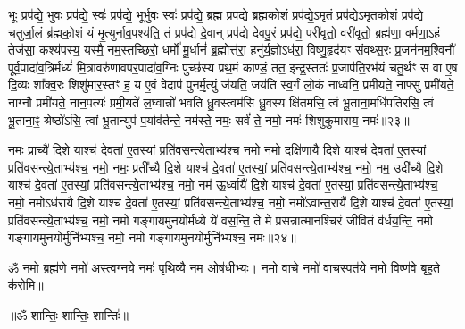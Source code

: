 भूः प्रप॑द्ये॒ भुवः॒ प्रप॑द्ये॒ स्वः॑ प्रप॑द्ये॒ भूर्भुवः॒ स्वः॑ प्रप॑द्ये॒ ब्रह्म॒ प्रप॑द्ये ब्रह्मको॒शं प्रप॑द्ये॒ऽमृतं॒ प्रप॑द्येऽमृतको॒शं प्रप॑द्ये चतुर्जा॒लं ब्र॑ह्मको॒शं यं मृ॒त्युर्नाव॒पश्य॑ति॒ तं प्रप॑द्ये दे॒वान् प्रप॑द्ये देवपु॒रं प्रप॑द्ये॒ परी॑वृतो॒ वरी॑वृतो॒ ब्रह्म॑णा॒ वर्म॑णा॒ऽहं तेज॑सा॒ कश्य॑पस्य॒ यस्मै॒ नम॒स्तच्छिरो॒ धर्मो॑ मू॒र्धानं॑ ब्र॒ह्मोत्त॑रा॒ हनु॑र्य॒ज्ञोऽध॑रा॒ विष्णु॒\ar{}हृद॑यꣳ संवथ्स॒रः प्र॒जन॑नम॒श्विनौ॑ पूर्व॒पादा॑व॒त्रिर्मध्यं॑ मि॒त्रावरु॑णावपर॒पादा॑व॒ग्निः पुच्छ॑स्य प्रथ॒मं काण्डं॒ तत॒ इन्द्र॒स्ततः॑ प्र॒जाप॑ति॒रभ॑यं चतु॒र्थꣳ स वा ए॒ष दि॒व्यः शा᳚क्व॒रः शिशु॑मार॒स्तꣳ ह॒ य ए॒वं वेदाप॑ पुनर्मृ॒त्युं ज॑यति॒ जय॑ति स्व॒र्गं लो॒कं नाध्वनि॒ प्रमी॑यते॒ नाफ्सु प्रमी॑यते॒ नाग्नौ प्रमी॑यते॒ नान॒पत्यः॑ प्रमी॒यते॑ ल॒घ्वान्नो॑ भवति ध्रु॒वस्त्वम॑सि ध्रु॒वस्य क्षि॑तमसि॒ त्वं भू॒ताना॒मधि॑पतिरसि॒ त्वं भू॒ताना॒ꣴ॒ श्रेष्ठो॑ऽसि॒ त्वां भू॒तान्युप॑ प॒र्याव॑र्तन्ते॒ नम॑स्ते॒ नमः॒ सर्वं॑ ते॒ नमो॒ नमः॑ शिशुकुमाराय॒ नमः॑॥२३॥
\anuvakamend

नमः॒ प्राच्यै॑ दि॒शे याश्च॑ दे॒वता॑ ए॒तस्यां॒ प्रति॑वसन्त्ये॒ताभ्य॑श्च॒  नमो॒ नमो दक्षि॑णायै दि॒शे याश्च॑ दे॒वता॑ ए॒तस्यां॒ प्रति॑वसन्त्ये॒ताभ्य॑श्च॒  नमो॒ नमः॒ प्रती᳚च्यै दि॒शे याश्च॑ दे॒वता॑ ए॒तस्यां॒ प्रति॑वसन्त्ये॒ताभ्य॑श्च॒  नमो॒ नम॒ उदी᳚च्यै दि॒शे याश्च॑ दे॒वता॑ ए॒तस्यां॒ प्रति॑वसन्त्ये॒ताभ्य॑श्च॒  नमो॒ नम॑ ऊ॒र्ध्वायै॑ दि॒शे याश्च॑ दे॒वता॑ ए॒तस्यां॒ प्रति॑वसन्त्ये॒ताभ्य॑श्च॒  नमो॒ नमोऽध॑रायै दि॒शे याश्च॑ दे॒वता॑ ए॒तस्यां॒ प्रति॑वसन्त्ये॒ताभ्य॑श्च॒  नमो॒ नमो॑ऽवान्त॒रायै॑ दि॒शे याश्च॑ दे॒वता॑ ए॒तस्यां॒ प्रति॑वसन्त्ये॒ताभ्य॑श्च॒  नमो॒ नमो गङ्गायमुनयोर्मध्ये ये॑ वस॒न्ति॒ ते मे प्रसन्नात्मानश्चिरं जीवितं व॑र्धय॒न्ति॒ नमो गङ्गायमुनयोर्मुनि॑भ्यश्च॒ नमो॒ नमो गङ्गायमुनयोर्मुनि॑भ्यश्च॒ नमः॥२४॥
\anuvakamend

ॐ नमो॒ ब्रह्म॑णे॒ नमो॑ अस्त्व॒ग्नये॒ नमः॑ पृथि॒व्यै नम॒ ओष॑धीभ्यः। 
नमो॑ वा॒चे नमो॑ वा॒चस्पत॑ये॒ नमो॒ विष्ण॑वे बृह॒ते क॑रोमि॥\\
\centerline{॥ॐ शान्तिः॒ शान्तिः॒ शान्तिः॑॥}

